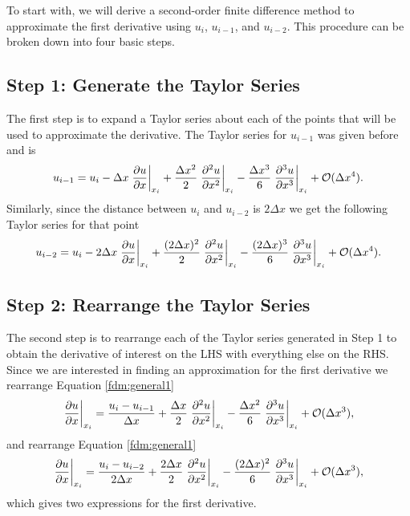 To start with, we will derive a second-order finite difference method to approximate the first derivative using $u_i$, $u_{i-1}$, and $u_{i-2}$. This procedure can be broken down into four basic steps.

\subsection{Step 1: Generate the Taylor Series}
The first step is to expand a Taylor series about each of the points that will be used to approximate the derivative. The Taylor series for $u_{i-1}$ was given before and is
\begin{equation}
	u_{i-1} = u_i - \Delta x \left.\frac{\partial u}{\partial x}\right\rvert_{x_i}^{} + \frac{\Delta x^2}{2} \left.\frac{\partial^2 u}{\partial x^2}\right\rvert_{x_i}^{} - \frac{\Delta x^3}{6} \left.\frac{\partial^3 u}{\partial x^3}\right\rvert_{x_i}^{} + \mathcal{O}(\Delta x^4).
	\label{fdm:general1}
\end{equation}
Similarly, since the distance between $u_i$ and $u_{i-2}$ is $2 \Delta x$ we get the following Taylor series for that point
\begin{equation}
	u_{i-2} = u_i - 2 \Delta x \left.\frac{\partial u}{\partial x}\right\rvert_{x_i}^{} + \frac{(2\Delta x)^2}{2} \left.\frac{\partial^2 u}{\partial x^2}\right\rvert_{x_i}^{} - \frac{(2\Delta x)^3}{6} \left.\frac{\partial^3 u}{\partial x^3}\right\rvert_{x_i}^{} + \mathcal{O}(\Delta x^4).
	\label{fdm:general2}
\end{equation}

\subsection{Step 2: Rearrange the Taylor Series}
The second step is to rearrange each of the Taylor series generated in Step 1 to obtain the derivative of interest on the LHS with everything else on the RHS. Since we are interested in finding an approximation for the first derivative we rearrange Equation \ref{fdm:general1}
\begin{equation}
	\left.\frac{\partial u}{\partial x}\right\rvert_{x_i}^{} = \frac{u_i - u_{i-1}}{\Delta x} + \frac{\Delta x}{2}\left.\frac{\partial^2 u}{\partial x^2}\right\rvert_{x_i}^{} - \frac{\Delta x^2}{6}\left.\frac{\partial^3 u}{\partial x^3}\right\rvert_{x_i}^{} + \mathcal{O}(\Delta x^3),
	\label{eqn:aHK8G4M7}
\end{equation}
and rearrange Equation \ref{fdm:general1}
\begin{equation}
	\left.\frac{\partial u}{\partial x}\right\rvert_{x_i}^{} = \frac{u_i - u_{i-2}}{2\Delta x} + \frac{2\Delta x}{2}\left.\frac{\partial^2 u}{\partial x^2}\right\rvert_{x_i}^{} - \frac{(2\Delta x)^2}{6}\left.\frac{\partial^3 u}{\partial x^3}\right\rvert_{x_i}^{} + \mathcal{O}(\Delta x^3),
	\label{eqn:6sbrhgAM}
\end{equation}
which gives two expressions for the first derivative.

